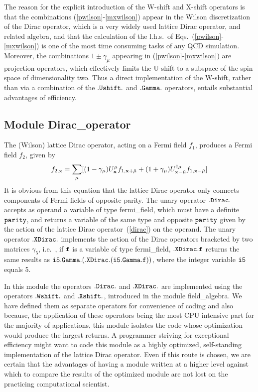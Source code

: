 The reason for the explicit introduction of the W-shift and X-shift
operators is that the combinations (\ref{pwilson}-\ref{mxwilson}) 
appear in the Wilson
discretization of the  Dirac operator, which is a very
widely used lattice Dirac operator, and related algebra,
and that the calculation of the l.h.s.~of Eqs.~(\ref{pwilson}-\ref{mxwilson}) 
is one of the most
time consuming tasks of any QCD simulation.  Moreover, the combinations
$1 \pm \gamma_{\mu}$ appearing in (\ref{pwilson}-\ref{mxwilson}) 
are projection operators, which effectively limits the U-shift to
a subspace of the spin space of dimensionality two.  Thus a direct
implementation of the W-shift, rather than via a combination of
the $\tt .Ushift.$ and $\tt .Gamma.$ operators, entails substantial
advantages of efficiency.

\subsection{Module Dirac\_operator}     
\label{diracop}

The (Wilson) lattice Dirac operator, acting on a Fermi field 
$f_1$, produces a Fermi field 
$f_2$, given by 
%
\begin{equation}
f_{2,{\bf x}}= \sum_{\mu} [(1-\gamma_{\mu})U^{\mu}_{{\bf x}} 
f_{1,{\bf x}+\hat\mu} + (1+\gamma_{\mu})
U^{\dagger \mu}_{{\bf x}-\hat\mu} f_{1,{\bf x}-\hat\mu}]
\label{dirac}
\end{equation}
%
It is obvious from this equation that the lattice Dirac operator 
only connects components of Fermi fields of opposite parity.
The unary operator $\tt .Dirac.$ accepts as operand a variable of
type fermi\_field, which must have a definite $\tt parity$,
and returns a variable of the same type and opposite $\tt parity$
given by the action of the lattice Dirac operator~(\ref{dirac})
on the operand.  The unary operator $\tt .XDirac.$ implements the
action of the Dirac operators bracketed by two matrices $\gamma_5$,
i.e.~, if $\tt f$ is a variable of type fermi\_field,  
$\tt .XDirac.f$ returns the same results as 
$\tt i5.Gamma.(.XDirac.(i5.Gamma.f))$, where the integer variable
$\tt i5$ equals 5.

In this module the operators $\tt .Dirac.$ and $\tt .XDirac.$ are  
implemented using the operators $\tt .Wshift.$ and $\tt .Xshift.$,  
introduced in the module field\_algebra.  We have defined them 
as separate operators for convenience of coding and
also because, the application of these operators being the most
CPU intensive part for the majority of applications, this module
isolates the code whose optimization would produce the largest
returns.  A programmer striving for exceptional efficiency might
want to code this module as a highly optimized, self-standing
implementation of the lattice Dirac operator.  Even if this route
is chosen, we are certain that the advantages of having a module
written at a higher level against which to compare the results
of the optimized module are not lost on the practicing 
computational scientist.

